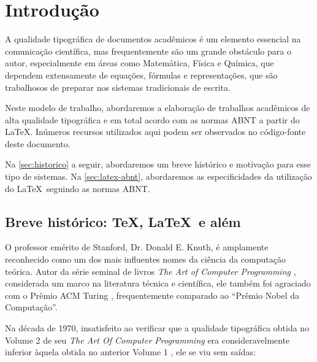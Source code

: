 \chapter{Introdução} \label{chap:intro}

A qualidade tipográfica de documentos acadêmicos é um elemento essencial na comunicação científica, mas frequentemente são um grande obstáculo para o autor, especialmente em áreas como Matemática, Física e Química, que dependem extensamente de equações, fórmulas e representações, que são trabalhosos de preparar nos sistemas tradicionais de escrita.

Neste modelo de trabalho, abordaremos a elaboração de trabalhos acadêmicos de alta qualidade tipográfica e em total acordo com as normas ABNT a partir do \LaTeX. Inúmeros recursos utilizados aqui podem ser observados no código-fonte deste documento.

Na \autoref{sec:historico} a seguir, abordaremos um breve histórico e motivação para esse tipo de sistemas. Na \autoref{sec:latex-abnt}, abordaremos as especificidades da utilização do \LaTeX\ seguindo as normas ABNT.

\section{Breve histórico: \TeX, \LaTeX\ e além} \label{sec:historico}

O professor emérito de Stanford, Dr. Donald E. Knuth, é amplamente reconhecido como um dos mais influentes nomes da ciência da computação teórica. Autor da série seminal de livros \emph{The Art of Computer Programming} \cite{Knuth-TAOCP}, considerada um marco na literatura técnica e científica, ele também foi agraciado com o Prêmio ACM Turing \cite{KnuthTuring1974}, frequentemente comparado ao ``Prêmio Nobel da Computação''.

Na década de 1970, insatisfeito ao verificar que a qualidade tipográfica obtida no Volume 2 de seu \emph{The Art Of Computer Programming} \cite{Knuth-TAOCP-2} era consideravelmente inferior àquela obtida no anterior Volume 1 \cite{Knuth-TAOCP-1}, ele se viu sem saídas:

